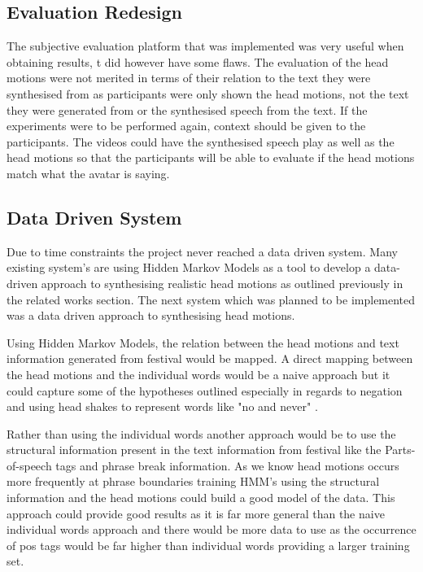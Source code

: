 \documentclass[bsc,frontabs,twoside,singlespacing,parskip,deptreport]{infthesis}
\begin{document}
\subsection{Evaluation Redesign}

The subjective evaluation platform that was implemented was very useful when obtaining results, t did however have some flaws. The evaluation of the head motions were not merited in terms of their relation to the text they were synthesised from as participants were only shown the head motions, not the text they were generated from or the synthesised speech from the text. If the experiments were to be performed again, context should be given to the participants. The videos could have the synthesised speech play as well as the head motions so that the participants will be able to evaluate if the head motions match what the avatar is saying.

%

\subsection{Data Driven System}

Due to time constraints the project never reached a data driven system. Many existing system's are using Hidden Markov Models as a tool to develop a data-driven approach to synthesising realistic head motions as outlined previously in the related works section. The next system which was planned to be implemented was a data driven approach to synthesising head motions.

Using Hidden Markov Models, the relation between the head motions and text information generated from festival would be mapped. A direct mapping between the head motions and the individual words would be a naive approach but it could capture some of the hypotheses outlined especially in regards to negation and using head shakes to represent words like "no and never"  \cite{head_shaking}.

Rather than using the individual words another approach would be to use the structural information present in the text information from festival like the Parts-of-speech tags and phrase break information. As we know head motions occurs more frequently at phrase boundaries \cite{ishi2008} training HMM's using the structural information and the head motions could build a good model of the data. This approach could provide good results as it is far more general than the naive individual words approach and there would be more data to use as the occurrence of pos tags would be far higher than individual words providing a larger training set.
\end{document}
